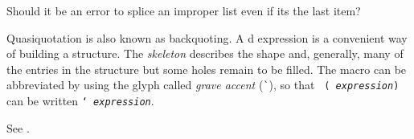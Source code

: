\gdef\module{syntax-0}
\label{backquote}
%
\begin{optPrivate}
    Should it be an error to splice an improper list even if its the last item?
\end{optPrivate}
%
\begin{optDefinition}

%
\Syntax
{}%
%
\remarks%
Quasiquotation is also known as backquoting.  A d
expression is a convenient way of building a structure.  The {\em skeleton}
describes the shape and, generally, many of the entries in the structure but
some holes remain to be filled.  The  macro can be
abbreviated by using the glyph called {\em grave accent}
(\verb+`+), so that {\tt
    ( {\em expression})} can be written {\tt `{\em
        expression}}.

\Syntax
{}%
%
\remarks%
See .


\end{optDefinition}
